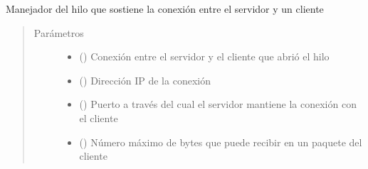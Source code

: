 \documentclass[letterpaper,10pt,spanish,openany,oneside]{sphinxmanual}
\begin{document}
\begin{fulllineitems}
\label{\detokenize{server:server.clientThread}}
Manejador del hilo que sostiene la conexión entre el servidor y un cliente
\begin{quote}\begin{description}
\item[{Parámetros}] \leavevmode\begin{itemize}
\item {} 
 () \textendash{} Conexión entre el servidor y el cliente que abrió el hilo

\item {} 
 () \textendash{} Dirección IP de la conexión

\item {} 
 () \textendash{} Puerto a través del cual el servidor mantiene la conexión con el cliente

\item {} 
 () \textendash{} Número máximo de bytes que puede recibir en un paquete del cliente

\end{itemize}

\end{description}\end{quote}

\end{fulllineitems}

\end{document}
